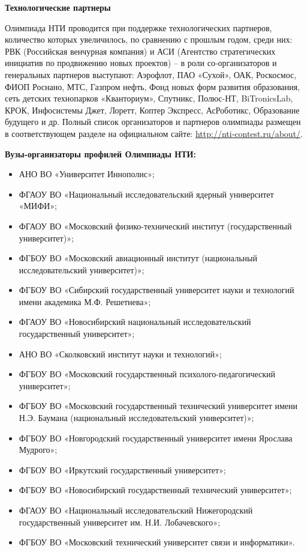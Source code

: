 \textbf{Технологические партнеры}

Олимпиада НТИ проводится при поддержке технологических партнеров, количество которых увеличилось, по сравнению с прошлым годом,  среди них: РВК (Российская венчурная компания) и АСИ (Агентство стратегических инициатив по продвижению новых проектов)  –  в роли со-организаторов и генеральных партнеров выступают: Аэрофлот, ПАО «Сухой», ОАК, Роскосмос, ФИОП Роснано, МТС, Газпром нефть, Фонд новых форм развития образования, сеть детских технопарков «Кванториум», Спутникс, Полюс-НТ, BiTronicsLab, КРОК,  Инфосистемы Джет, Лоретт, Коптер Экспресс, АсРоботикс, Образование будущего и др. Полный список организаторов и партнеров олимпиады размещен в соответствующем разделе на официальном сайте: \url{http://nti-contest.ru/about/}.

\textbf{Вузы-организаторы профилей Олимпиады НТИ:}
\begin{itemize}
    \item АНО ВО «Университет Иннополис»; 
    \item ФГАОУ ВО «Национальный исследовательский ядерный университет «МИФИ»;
    \item ФГАОУ ВО «Московский физико-технический институт (государственный университет)»;
    \item ФГБОУ ВО «Московский авиационный институт (национальный исследовательский университет)»;
    \item ФГБОУ ВО «Сибирский государственный университет науки и технологий имени академика М.Ф. Решетнева»;
    \item ФГАОУ ВО «Новосибирский национальный исследовательский государственный университет»;
    \item АНО ВО «Сколковский институт науки и технологий»;
    \item ФГБОУ ВО «Московский государственный психолого-педагогический университет»;
    \item ФГБОУ ВО «Московский государственный технический университет имени Н.Э. Баумана (национальный исследовательский университет)»;
    \item ФГБОУ ВО «Новгородский государственный университет имени Ярослава Мудрого»;
    \item ФГБОУ ВО «Иркутский государственный университет»;
    \item ФГБОУ ВО «Новосибирский государственный технический университет»;
    \item ФГАОУ ВО «Национальный исследовательский Нижегородский государственный университет им. Н.И. Лобачевского»;
    \item ФГБОУ ВО «Московский технический университет связи и информатики».
\end{itemize}

